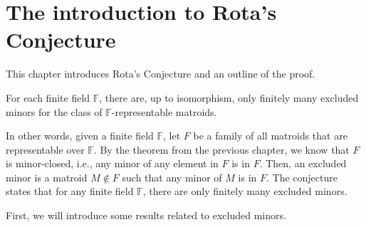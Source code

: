 \section{The introduction to Rota's Conjecture}
This chapter introduces Rota's Conjecture and an outline of the proof.

\begin{conj}
For each finite field $\mathbb{F}$, there are, up to isomorphism, only finitely many excluded minors for the class of $\mathbb{F}$-representable matroids.
\end{conj}

In other words, given a finite field $\mathbb{F}$, let $F$ be a family of all matroids that are representable over $\mathbb{F}$.
By the theorem from the previous chapter, we know that $F$ is minor-closed, i.e., any minor of any element in $F$ is in $F$.
Then, an excluded minor is a matroid $M \notin F$ such that any minor of $M$ is in $F$.
The conjecture states that for any finite field $\mathbb{F}$, there are only finitely many excluded minors.

First, we will introduce some results related to excluded minors.

